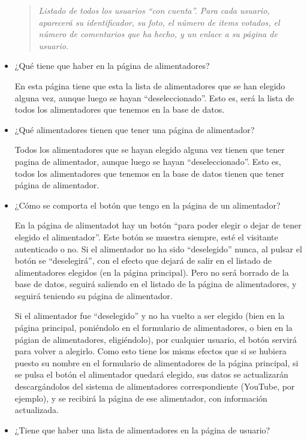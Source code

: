 \begin{itemize}
  \begin{quote}
  {\em Listado de todos los usuarios ``con cuenta''. Para cada usuario, aparecerá su identificador, su foto, el número de items votados, el número de comentarios que ha hecho, y un enlace a su página de usuario.}
  \end{quote}

\item ¿Qué tiene que haber en la página de alimentadores?

  En esta página tiene que esta la lista de alimentadores que se han elegido alguna vez, aunque luego se hayan ``deseleccionado''. Esto es, será la lista de todos los alimentadores que tenemos en la base de datos.

\item ¿Qué alimentadores tienen que tener una página de alimentador?

  Todos los alimentadores que se hayan elegido alguna vez tienen que tener pagina de alimentador, aunque luego se hayan ``deseleccionado''. Esto es, todos los alimentadores que tenemos en la base de datos tienen que tener página de alimentador.

\item ¿Cómo se comporta el botón que tengo en la página de un alimentador?

  En la página de alimentadot hay un botón ``para poder elegir o dejar de tener elegido el alimentador''. Este botón se muestra siempre, esté el visitante autenticado o no. Si el alimentador no ha sido ``deselegido'' nunca, al pulsar el botón se ``deselegirá'', con el efecto que dejará de salir en el listado de alimentadores elegidos (en la página principal). Pero no será borrado de la base de datos, seguirá saliendo en el listado de la página de alimentadores, y seguirá teniendo su página de alimentador.

  Si el alimentador fue ``deselegido'' y no ha vuelto a ser elegido (bien en la página principal, poniéndolo en el formulario de alimentadores, o bien en la págian de alimentadores, eligiéndolo), por cualquier usuario, el botón servirá para volver a alegirlo. Como esto tiene los misms efectos que si se hubiera puesto su nombre en el formulario de alimentadores de la página principal, si se pulsa el botón el alimentador quedará elegido, sus datos se actualizarán descargándolos del sistema de alimentadores correspondiente (YouTube, por ejemplo), y se recibirá la página de ese alimentador, con información actualizada.
  
\item ¿Tiene que haber una lista de alimentadores en la página de usuario?


\end{itemize}
